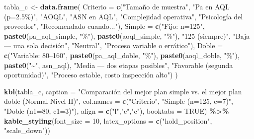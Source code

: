 \documentclass[
  12pt,
]{article}
\newenvironment{Shaded}{\begin{snugshade}}{\end{snugshade}}
\newcommand{\AttributeTok}[1]{\textcolor[rgb]{0.13,0.29,0.53}{#1}}
\newcommand{\ConstantTok}[1]{\textcolor[rgb]{0.56,0.35,0.01}{#1}}
\newcommand{\DecValTok}[1]{\textcolor[rgb]{0.00,0.00,0.81}{#1}}
\newcommand{\FunctionTok}[1]{\textcolor[rgb]{0.13,0.29,0.53}{\textbf{#1}}}
\newcommand{\NormalTok}[1]{#1}
\newcommand{\OtherTok}[1]{\textcolor[rgb]{0.56,0.35,0.01}{#1}}
\newcommand{\SpecialCharTok}[1]{\textcolor[rgb]{0.81,0.36,0.00}{\textbf{#1}}}
\newcommand{\StringTok}[1]{\textcolor[rgb]{0.31,0.60,0.02}{#1}}
\begin{document}
\begin{Shaded}
\begin{Highlighting}[]
\NormalTok{tabla\_c }\OtherTok{\textless{}{-}} \FunctionTok{data.frame}\NormalTok{(}
  \AttributeTok{Criterio =} \FunctionTok{c}\NormalTok{(}\StringTok{"Tamaño de muestra"}\NormalTok{, }
               \StringTok{"Pa en AQL (p=2.5\%)"}\NormalTok{,}
               \StringTok{"AOQL"}\NormalTok{, }
               \StringTok{"ASN en AQL"}\NormalTok{, }
               \StringTok{"Complejidad operativa"}\NormalTok{,}
               \StringTok{"Psicología del proveedor"}\NormalTok{,}
               \StringTok{"Recomendado cuando..."}\NormalTok{),}
  \AttributeTok{Simple =} \FunctionTok{c}\NormalTok{(}\StringTok{"Fijo: n=125"}\NormalTok{,}
             \FunctionTok{paste0}\NormalTok{(pa\_aql\_simple, }\StringTok{"\%"}\NormalTok{),}
             \FunctionTok{paste0}\NormalTok{(aoql\_simple, }\StringTok{"\%"}\NormalTok{),}
             \StringTok{"125 (siempre)"}\NormalTok{,}
             \StringTok{"Baja — una sola decisión"}\NormalTok{,}
             \StringTok{"Neutral"}\NormalTok{,}
             \StringTok{"Proceso variable o errático"}\NormalTok{),}
  \AttributeTok{Doble  =} \FunctionTok{c}\NormalTok{(}\StringTok{"Variable: 80–160"}\NormalTok{,}
             \FunctionTok{paste0}\NormalTok{(pa\_aql\_doble, }\StringTok{"\%"}\NormalTok{),}
             \FunctionTok{paste0}\NormalTok{(aoql\_doble, }\StringTok{"\%"}\NormalTok{),}
             \FunctionTok{paste0}\NormalTok{(}\StringTok{"\textasciitilde{}"}\NormalTok{, asn\_aql),}
             \StringTok{"Media — dos etapas posibles"}\NormalTok{,}
             \StringTok{"Favorable (segunda oportunidad)"}\NormalTok{,}
             \StringTok{"Proceso estable, costo inspección alto"}\NormalTok{)}
\NormalTok{)}

\FunctionTok{kbl}\NormalTok{(tabla\_c,}
    \AttributeTok{caption   =} \StringTok{"Comparación del mejor plan simple vs. el mejor plan doble (Normal Nivel II)"}\NormalTok{,}
    \AttributeTok{col.names =} \FunctionTok{c}\NormalTok{(}\StringTok{"Criterio"}\NormalTok{, }\StringTok{"Simple (n=125, c=7)"}\NormalTok{, }\StringTok{"Doble (n1=80, c1=3)"}\NormalTok{),}
    \AttributeTok{align     =} \FunctionTok{c}\NormalTok{(}\StringTok{"l"}\NormalTok{,}\StringTok{"c"}\NormalTok{,}\StringTok{"c"}\NormalTok{),}
    \AttributeTok{booktabs  =} \ConstantTok{TRUE}\NormalTok{) }\SpecialCharTok{\%\textgreater{}\%}
  \FunctionTok{kable\_styling}\NormalTok{(}\AttributeTok{font\_size =} \DecValTok{10}\NormalTok{,}
                \AttributeTok{latex\_options =} \FunctionTok{c}\NormalTok{(}\StringTok{"hold\_position"}\NormalTok{, }\StringTok{"scale\_down"}\NormalTok{))}
\end{Highlighting}
\end{Shaded}
\end{document}

